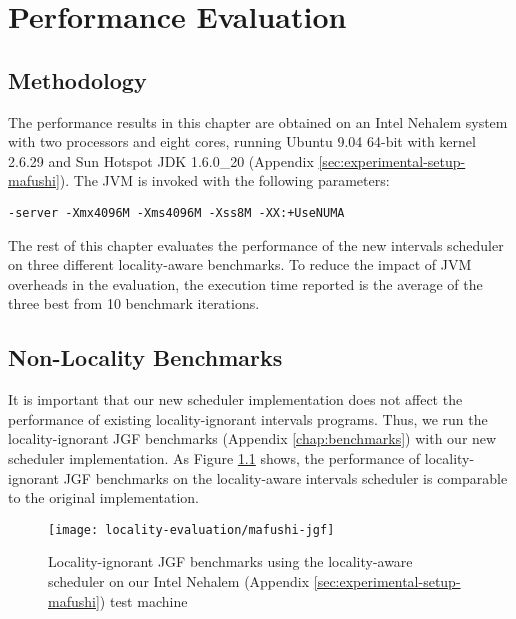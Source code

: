 
\chapter{Performance Evaluation}
\label{chap:locality-performance}

\section{Methodology}
\label{sec:locality-performance-methodology}


The performance results in this chapter are obtained on an Intel
Nehalem system with two processors and eight cores, running Ubuntu
9.04 64-bit with kernel 2.6.29 and Sun Hotspot JDK 1.6.0\_20 (Appendix
\ref{sec:experimental-setup-mafushi}). The JVM is invoked with the
following parameters:

\begin{lstlisting}[style=Listing]
  -server -Xmx4096M -Xms4096M -Xss8M -XX:+UseNUMA
\end{lstlisting}

The rest of this chapter evaluates the performance of the new
intervals scheduler on three different locality-aware benchmarks. To
reduce the impact of JVM overheads in the evaluation, the execution
time reported is the average of the three best from 10 benchmark
iterations.


\section{Non-Locality Benchmarks}
\label{sec:locality-performance-non-locality}

It is important that our new scheduler implementation does not affect
the performance of existing locality-ignorant intervals
programs. Thus, we run the locality-ignorant JGF benchmarks (Appendix
\ref{chap:benchmarks}) with our new scheduler implementation. As
Figure \ref{fig:locality-evaluation-jgf} shows, the performance of
locality-ignorant JGF benchmarks on the locality-aware intervals
scheduler is comparable to the original implementation.

\begin{figure}[!ht]
  \centering
  \texttt{[image: locality-evaluation/mafushi-jgf]}
  \caption[Locality-ignorant JGF benchmarks running on locality-aware
  scheduler]{Locality-ignorant JGF benchmarks using the locality-aware
    scheduler on our Intel Nehalem (Appendix
    \ref{sec:experimental-setup-mafushi}) test machine}
  \label{fig:locality-evaluation-jgf}
\end{figure}

